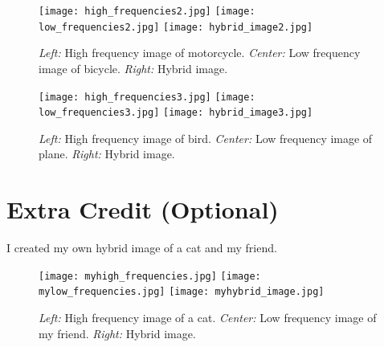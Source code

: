 \begin{figure}
    \centering
    \texttt{[image: high\_frequencies2.jpg]}
    \texttt{[image: low\_frequencies2.jpg]}
    \texttt{[image: hybrid\_image2.jpg]}
    \caption{\emph{Left:} High frequency image of motorcycle. \emph{Center:} Low frequency image of bicycle. \emph{Right:} Hybrid image.}
\end{figure}

\begin{figure} 
    \centering
    \texttt{[image: high\_frequencies3.jpg]}
    \texttt{[image: low\_frequencies3.jpg]}
    \texttt{[image: hybrid\_image3.jpg]}
    \caption{\emph{Left:} High frequency image of bird. \emph{Center:} Low frequency image of plane. \emph{Right:} Hybrid image.}
\end{figure}

\section*{Extra Credit (Optional)}
I created my own hybrid image of a cat and my friend. 
\begin{figure}[h]
    \centering
    \texttt{[image: myhigh\_frequencies.jpg]}
    \texttt{[image: mylow\_frequencies.jpg]}
    \texttt{[image: myhybrid\_image.jpg]}
    \caption{\emph{Left:} High frequency image of a cat. \emph{Center:} Low frequency image of my friend. \emph{Right:} Hybrid image.}
\end{figure}


